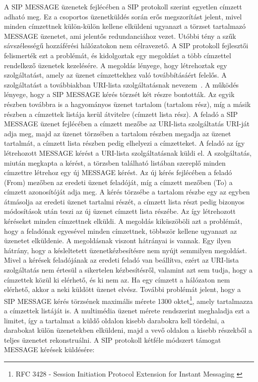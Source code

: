 A SIP MESSAGE üzenetek fejlécében a SIP protokoll szerint egyetlen címzett adható meg. Ez a csoportos üzenetküldés során erős megszorítást jelent, mivel minden címzettnek külön-külön kellene elküldeni ugyanazt a törzset tartalmazó MESSAGE üzenetet, ami jelentős redundanciához vezet. Utóbbi tény a szűk sávszélességű hozzáférési hálózatokon nem célravezető. A SIP protokoll fejlesztői felismerték ezt a problémát, és kidolgoztak egy megoldást a több címzettel rendelkező üzenetek kezelésére.
A megoldás lényege, hogy létrehoztak egy szolgáltatást, amely az üzenet címzettekhez való továbbításáért felelős. A szolgáltatást a továbbiakban URI-lista szolgáltatásnak nevezem~\cite{rfc5365}. A működés lényege, hogy a SIP MESSAGE kérés törzsét két részre bontották. Az egyik részben továbbra is a hagyományos üzenet tartalom (tartalom rész), míg a másik részben a címzettek listája kerül átvitelre (címzett lista rész). A feladó a SIP MESSAGE üzenet fejlécében a címzett mezőbe az URI-lista szolgáltatás URI-ját adja meg, majd az üzenet törzsében a tartalom részben megadja az üzenet tartalmát, a címzett lista részben pedig elhelyezi a címzetteket. A feladó az így létrehozott MESSAGE kérést a URI-lista szolgáltatásnak küldi el. A szolgáltatás, miután megkapta a kérést, a törzsben található listában szereplő minden címzettre létrehoz egy új MESSAGE kérést. Az új kérés fejlécében a feladó (From) mezőben az eredeti üzenet feladóját, míg a címzett mezőben (To) a címzett azonosítóját adja meg. A kérés törzsébe a tartalom részbe egy az egyben átmásolja az eredeti üzenet tartalmi részét, a címzett lista részt pedig bizonyos módosítások után teszi az új üzenet címzett lista részébe. Az így létrehozott kéréseket minden címzettnek elküldi. A megoldás kiküszöböli azt a problémát, hogy a feladónak egyesével minden címzettnek, többször kellene ugyanazt az üzenetet elküldenie. A megoldásnak viszont hátrányai is vannak. Egy ilyen hátrány, hogy a késleltetett üzenetkézbesítésre nem nyújt semmilyen megoldást. Mivel a kérések feladójának az eredeti feladó van beállítva, ezért az URI-lista szolgáltatás nem értesül a sikertelen kézbesítésről, valamint azt sem tudja, hogy a címzettek közül ki elérhető, és ki nem az. Ha egy címzett a hálózaton nem elérhető, akkor a neki küldött üzenet elvész. További problémát jelent, hogy a SIP MESSAGE kérés törzsének maximális mérete 1300 oktet\footnote{RFC 3428 - Session Initiation Protocol Extension for Instant Messaging \cite{rfc3428}}, amely tartalmazza a címzettek listáját is. A multimédia üzenet mérete rendszerint meghaladja ezt a limitet, így a tartalmat a küldő oldalon kisebb darabokra kell tördelni, a darabokat külön üzenetekben elküldeni, majd a vevő oldalon a kisebb részekből a teljes üzenetet rekonstruálni. A SIP protokoll kétféle módszert támogat MESSAGE kérések küldésére:

